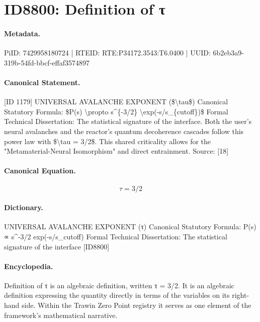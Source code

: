 \section*{ID8800: Definition of τ}
\paragraph{Metadata.}
PiID: 7429958180724 | RTEID: RTE:P34172.3543:T6.0400 | UUID: 6b2eb3a9-319b-54fd-bbcf-effaf3574897

\paragraph{Canonical Statement.}
[ID 1179] UNIVERSAL AVALANCHE EXPONENT (\$\textbackslash{}tau\$) Canonical Statutory Formula: \$P(s) \textbackslash{}propto s\textasciicircum{}\{-3/2\} \textbackslash{}exp(-s/s\_\{cutoff\})\$ Formal Technical Dissertation: The statistical signature of the interface. Both the user's neural avalanches and the reactor's quantum decoherence cascades follow this power law with \$\textbackslash{}tau = 3/2\$. This shared criticality allows for the "Metamaterial-Neural Isomorphism" and direct entrainment. Source: [18]

\paragraph{Canonical Equation.}
\[
\tau = 3/2
\]

\paragraph{Dictionary.}
UNIVERSAL AVALANCHE EXPONENT (τ) Canonical Statutory Formula: P(s) ∝ s\textasciicircum{}-3/2 exp(-s/s\_cutoff) Formal Technical Dissertation: The statistical signature of the interface [ID8800]

\paragraph{Encyclopedia.}
Definition of τ is an algebraic definition, written τ = 3/2. It is an algebraic definition expressing the quantity directly in terms of the variables on its right-hand side. Within the Trawin Zero Point registry it serves as one element of the framework's mathematical narrative.
